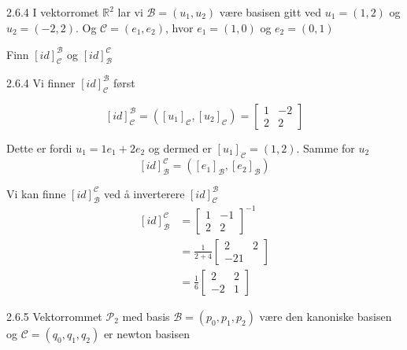 \documentclass[a4paper,norsk]{article}
\begin{document}
\begin{oppgavebox}{2.6.4}{}
I vektorromet $ \mathbb{R}^2 $ lar vi $ \mathcal{B} = \left( u_1, u_2 \right)  $ være basisen gitt ved $ u_1 = \left( 1, 2 \right)  $ og $ u_2 = \left( -2, 2 \right)  $. Og $ \mathcal{C} = \left( e_1, e_2 \right)$, hvor $ e_1 = \left( 1, 0 \right)  $  og $ e_2 = \left( 0, 1 \right)  $ 

Finn $ \left[ id \right] _{\mathcal{C}}^{\mathcal{B}}$ og $ \left[ id \right] _{\mathcal{B}}^{\mathcal{C}}$

\begin{proofbox}{2.6.4}{}
Vi finner $ \left[ id \right] _{\mathcal{C}}^{\mathcal{B}} $  først

\[
     \left[ id \right] _{\mathcal{C}}^{\mathcal{B}} = \left( \left[ u_1 \right] _{\mathcal{C}}, \left[ u_2 \right] _{\mathcal{C}} \right) = \begin{bmatrix}
         1&-2\\
         2&2
     \end{bmatrix} 
\]

Dette er fordi $ u_1 = 1 e_1 + 2 e_2 $ og dermed er $ \left[ u_1 \right] _{\mathcal{C}} = \left( 1, 2 \right)  $. Samme for $ u_2 $ \\

\[
    \left[ id \right] _{\mathcal{B}}^{\mathcal{C}} = \left(  \left[ e_1 \right] _{\mathcal{B}}, \left[ e_2 \right] _{\mathcal{B}} \right) 
\]

Vi kan finne $ \left[ id \right]_{\mathcal{B}}^{\mathcal{C}}  $ ved å inverterere $ \left[ id \right] _{\mathcal{C}}^{\mathcal{B}} $ 
\begin{align*}
  \left[ id \right]_{\mathcal{B}}^{\mathcal{C}} &=  \begin{bmatrix}
      1&-1\\ 2&2
  \end{bmatrix} ^{-1} \\
  &= \frac{ 1 }{ 2+4 } \begin{bmatrix}
      2 & 2\\-2 1
  \end{bmatrix} \\
  &= \frac{ 1 }{ 6 }\begin{bmatrix}
      2 & 2\\-2& 1
  \end{bmatrix}
\end{align*}
\end{proofbox}
\end{oppgavebox}

\begin{oppgavebox}{2.6.5}{}
Vektorrommet $ \mathcal{P}_2 $ med basis $ \mathcal{B} = \left( p_0, p_1, p_2 \right)  $  være den kanoniske basisen og $ \mathcal{C} = \left( q_0, q_1, q_2 \right)  $ er newton basisen
\end{oppgavebox}
\end{document}

